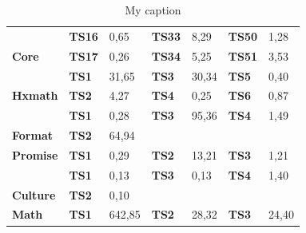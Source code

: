 \begin{table}[h]
{\begin{tabular}{|l|l|l|l|l|l|l|}
		& \textbf{TS16}      & 0,65                             & \textbf{TS33}      & 8,29                          & \textbf{TS50}      & 1,28                           \\ \cline{2-7} 
		\multirow{-17}{*}{\textbf{Core}}   & \textbf{TS17}      & 0,26                             & \textbf{TS34}      & 5,25                          & \textbf{TS51}      & 3,53                           \\ \hline
		& \textbf{TS1}       & 31,65                            & \textbf{TS3}       & 30,34                         & \textbf{TS5}       & 0,40                           \\ \cline{2-7} 
		\multirow{-2}{*}{\textbf{Hxmath}}  & \textbf{TS2}       & 4,27                             & \textbf{TS4}       & 0,25                          & \textbf{TS6}       & 0,87                           \\ \hline
		& \textbf{TS1}       & 0,28                             & \textbf{TS3}       & \cellcolor[HTML]{C0C0C0}95,36 & \textbf{TS4}       & 1,49                           \\ \cline{2-7} 
		\multirow{-2}{*}{\textbf{Format}}  & \textbf{TS2}       & \cellcolor[HTML]{C0C0C0}64,94    & \multicolumn{4}{l|}{\textbf{}}                                                                           \\ \hline
		\textbf{Promise}                   & \textbf{TS1}       & 0,29                             & \textbf{TS2}       & 13,21                         & \textbf{TS3}       & 1,21                           \\ \hline
		& \textbf{TS1}       & 0,13                             & \textbf{TS3}       & 0,13                          & \textbf{TS4}       & 1,40                           \\ \cline{2-7} 
		\multirow{-2}{*}{\textbf{Culture}} & \textbf{TS2}       & 0,10                             & \multicolumn{4}{l|}{}                                                                                    \\ \hline
		\textbf{Math}                      & \textbf{TS1}       & \cellcolor[HTML]{C0C0C0}642,85   & \textbf{TS2}       & 28,32                         & \textbf{TS3}       & 24,40                          \\ \hline
	\end{tabular}%
	}
		\caption{My caption}
		\label{my-label}
\end{table}

